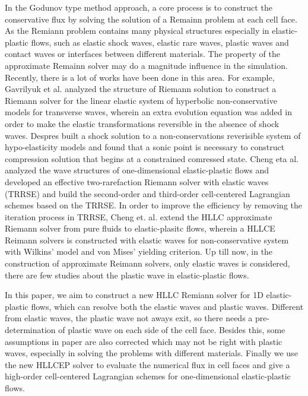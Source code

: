 \documentclass{article}
\theoremstyle{plain}\newtheorem{definition}{\sc{Definition}}
\theoremstyle{defination}\newtheorem{example}{Example}[section]
\numberwithin{equation}{section}
\numberwithin{table}{section}
\begin{document}
In the  Godunov type method  approach,  a core process is to construct the conservative flux by solving  the solution of a  Remainn problem  at each cell face. As the Remiann problem contains many physical structures especially in elastic-plastic flows, such as elastic shock waves, elastic rare waves, plastic waves and contact waves or interfaces between different materials. The property of the approximate Remainn solver may do a magnitude influence in the simulation. Recently, there is a lot of works have been done in this area. For example, Gavrilyuk et al. analyzed the structure of Riemann solution to construct a Riemann solver for the linear elastic system  of hyperbolic non-conservative models for transverse waves, wherein an extra evolution equation was added in order to make the elastic transformations reversible in the absence of shock waves. Despres built a shock solution to a non-conservations reverisible system of hypo-elasticity models and found that a sonic point is necessary to construct compression solution that begins at a constrained comressed state.  Cheng eta al. analyzed the wave structures of one-dimensional elastic-plastic flows and developed an effective two-rarefaction Riemann solver with elastic waves (TRRSE) and build the second-order and third-order cell-centered Lagrangian schemes based on the TRRSE. In order to improve the efficiency by removing the iteration process in TRRSE, Cheng et. al. extend the HLLC approximate Riemann solver from pure fluids to elastic-plasitc flows, wherein a HLLCE Reimann solvers is constructed with elastic waves for non-conservative system with Wilkins' model and von Mises' yielding criterion. 
Up till now, in the construction of approximate Reimann solvers, only elastic waves is considered, there are  few studies about the plastic wave in elastic-plastic flows.

In this paper,  we aim to construct a new HLLC Remiann solver for 1D elastic-plastic flows, which can resolve both the elastic waves and plastic waves. Different from elastic waves, the  plastic wave not aways exit, so there needs a pre-determination of plastic wave on each side of the cell face. Besides this, some assumptions in paper \cite{cheng} are also corrected which may not be right with plastic waves, especially in solving the problems with different materials. Finally we use  the new HLLCEP solver to evaluate the numerical flux in cell faces  and give a high-order cell-centered Lagrangian schemes for one-dimensional elastic-plastic flows. 
\end{document}
